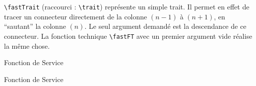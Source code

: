 		{\color{blue}\verb'\fastTrait'} (raccourci : {\color{blue}\verb'\trait'}) représente un simple trait.
		Il permet en effet de tracer un connecteur directement de la colonne $(n-1)$ à $(n+1)$, en ``sautant'' la colonne $(n)$.
		Le seul argument demandé est la descendance de ce connecteur.
		La fonction technique {\color{blue}\verb'\fastFT'} avec un premier argument vide réalise la même chose.

\begin{code}
\begin{fast}{Fonction de Service}
	\fastFT{}	{
		}
\end{fast}
\end{code}
		\cqd
\begin{exemple}
\begin{fast}{Fonction de Service}
	\fastFT{}	{
		}
\end{fast}
\end{exemple}



